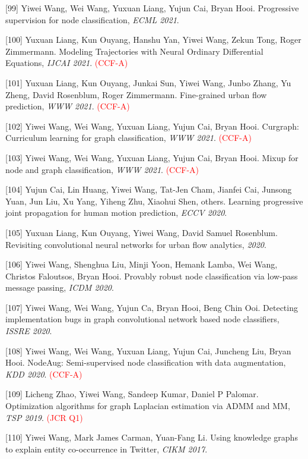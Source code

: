 [99] Yiwei Wang, Wei Wang, Yuxuan Liang, Yujun Cai, Bryan Hooi. Progressive supervision for node classification, \textit{ECML 2021}.

[100] Yuxuan Liang, Kun Ouyang, Hanshu Yan, Yiwei Wang, Zekun Tong, Roger Zimmermann. Modeling Trajectories with Neural Ordinary Differential Equations, \textit{IJCAI 2021}. \textcolor{red}{(CCF-A)}

[101] Yuxuan Liang, Kun Ouyang, Junkai Sun, Yiwei Wang, Junbo Zhang, Yu Zheng, David Rosenblum, Roger Zimmermann. Fine-grained urban flow prediction, \textit{WWW 2021}. \textcolor{red}{(CCF-A)}

[102] Yiwei Wang, Wei Wang, Yuxuan Liang, Yujun Cai, Bryan Hooi. Curgraph: Curriculum learning for graph classification, \textit{WWW 2021}. \textcolor{red}{(CCF-A)}

[103] Yiwei Wang, Wei Wang, Yuxuan Liang, Yujun Cai, Bryan Hooi. Mixup for node and graph classification, \textit{WWW 2021}. \textcolor{red}{(CCF-A)}

[104] Yujun Cai, Lin Huang, Yiwei Wang, Tat-Jen Cham, Jianfei Cai, Junsong Yuan, Jun Liu, Xu Yang, Yiheng Zhu, Xiaohui Shen, others. Learning progressive joint propagation for human motion prediction, \textit{ECCV 2020}.

[105] Yuxuan Liang, Kun Ouyang, Yiwei Wang, David Samuel Rosenblum. Revisiting convolutional neural networks for urban flow analytics, \textit{ 2020}.

[106] Yiwei Wang, Shenghua Liu, Minji Yoon, Hemank Lamba, Wei Wang, Christos Faloutsos, Bryan Hooi. Provably robust node classification via low-pass message passing, \textit{ICDM 2020}.

[107] Yiwei Wang, Wei Wang, Yujun Ca, Bryan Hooi, Beng Chin Ooi. Detecting implementation bugs in graph convolutional network based node classifiers, \textit{ISSRE 2020}.

[108] Yiwei Wang, Wei Wang, Yuxuan Liang, Yujun Cai, Juncheng Liu, Bryan Hooi. NodeAug: Semi-supervised node classification with data augmentation, \textit{KDD 2020}. \textcolor{red}{(CCF-A)}

[109] Licheng Zhao, Yiwei Wang, Sandeep Kumar, Daniel P Palomar. Optimization algorithms for graph Laplacian estimation via ADMM and MM, \textit{TSP 2019}. \textcolor{red}{(JCR Q1)}

[110] Yiwei Wang, Mark James Carman, Yuan-Fang Li. Using knowledge graphs to explain entity co-occurrence in Twitter, \textit{CIKM 2017}.
